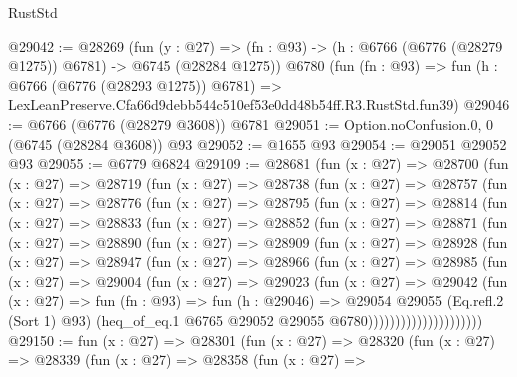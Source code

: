\begin{lexlean}{RustStd}
\begin{coremodule}
@29042 := @28269
    (fun (y : @27) =>
    (fn : @93) -> (h : @6766 (@6776 (@28279 @1275)) @6781) -> @6745 (@28284 @1275))
    @6780
    (fun (fn : @93) =>
    fun (h : @6766 (@6776 (@28293 @1275)) @6781) =>
    LexLeanPreserve.Cfa66d9debb544c510ef53e0dd48b54ff.R3.RustStd.fun39)
@29046 := @6766 (@6776 (@28279 @3608)) @6781
@29051 := Option.noConfusion.{0, 0} (@6745 (@28284 @3608)) @93
@29052 := @1655 @93
@29054 := @29051 @29052 @93
@29055 := @6779 @6824
@29109 := @28681
    (fun (x : @27) =>
    @28700
      (fun (x : @27) =>
      @28719
        (fun (x : @27) =>
        @28738
          (fun (x : @27) =>
          @28757
            (fun (x : @27) =>
            @28776
              (fun (x : @27) =>
              @28795
                (fun (x : @27) =>
                @28814
                  (fun (x : @27) =>
                  @28833
                    (fun (x : @27) =>
                    @28852
                      (fun (x : @27) =>
                      @28871
                        (fun (x : @27) =>
                        @28890
                          (fun (x : @27) =>
                          @28909
                            (fun (x : @27) =>
                            @28928
                              (fun (x : @27) =>
                              @28947
                                (fun (x : @27) =>
                                @28966
                                  (fun (x : @27) =>
                                  @28985
                                    (fun (x : @27) =>
                                    @29004
                                      (fun (x : @27) =>
                                      @29023
                                        (fun (x : @27) =>
                                        @29042
                                          (fun (x : @27) =>
                                          fun (fn : @93) =>
                                          fun (h : @29046) =>
                                          @29054
                                            @29055
                                            (Eq.refl.{2} (Sort 1) @93)
                                            (heq_of_eq.{1}
                                              @6765
                                              @29052
                                              @29055
                                              @6780)))))))))))))))))))))
@29150 := fun (x : @27) =>
  @28301
    (fun (x : @27) =>
    @28320
      (fun (x : @27) =>
      @28339
        (fun (x : @27) =>
        @28358
          (fun (x : @27) =>

\end{coremodule}
\end{lexlean}
